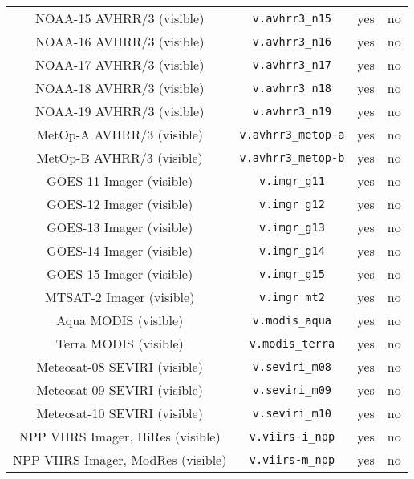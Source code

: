 \begin{center}
\begin{longtable}{c c c c}
  NOAA-15 AVHRR/3 (visible)          & \texttt{v.avhrr3\_n15}       &  yes     &  no        \\
  NOAA-16 AVHRR/3 (visible)          & \texttt{v.avhrr3\_n16}       &  yes     &  no        \\
  NOAA-17 AVHRR/3 (visible)          & \texttt{v.avhrr3\_n17}       &  yes     &  no        \\
  NOAA-18 AVHRR/3 (visible)          & \texttt{v.avhrr3\_n18}       &  yes     &  no        \\
  NOAA-19 AVHRR/3 (visible)          & \texttt{v.avhrr3\_n19}       &  yes     &  no        \\
  MetOp-A AVHRR/3 (visible)          & \texttt{v.avhrr3\_metop-a}   &  yes     &  no        \\
  MetOp-B AVHRR/3 (visible)          & \texttt{v.avhrr3\_metop-b}   &  yes     &  no        \\
  GOES-11 Imager (visible)           & \texttt{v.imgr\_g11}         &  yes     &  no        \\
  GOES-12 Imager (visible)           & \texttt{v.imgr\_g12}         &  yes     &  no        \\
  GOES-13 Imager (visible)           & \texttt{v.imgr\_g13}         &  yes     &  no        \\
  GOES-14 Imager (visible)           & \texttt{v.imgr\_g14}         &  yes     &  no        \\
  GOES-15 Imager (visible)           & \texttt{v.imgr\_g15}         &  yes     &  no        \\
  MTSAT-2 Imager (visible)           & \texttt{v.imgr\_mt2}         &  yes     &  no        \\
  Aqua MODIS (visible)               & \texttt{v.modis\_aqua}       &  yes     &  no        \\
  Terra MODIS (visible)              & \texttt{v.modis\_terra}      &  yes     &  no        \\
  Meteosat-08 SEVIRI (visible)       & \texttt{v.seviri\_m08}       &  yes     &  no        \\
  Meteosat-09 SEVIRI (visible)       & \texttt{v.seviri\_m09}       &  yes     &  no        \\
  Meteosat-10 SEVIRI (visible)       & \texttt{v.seviri\_m10}       &  yes     &  no        \\
  NPP VIIRS Imager, HiRes (visible)  & \texttt{v.viirs-i\_npp}      &  yes     &  no        \\
  NPP VIIRS Imager, ModRes (visible) & \texttt{v.viirs-m\_npp}      &  yes     &  no        \\

\end{longtable}
\end{center}
